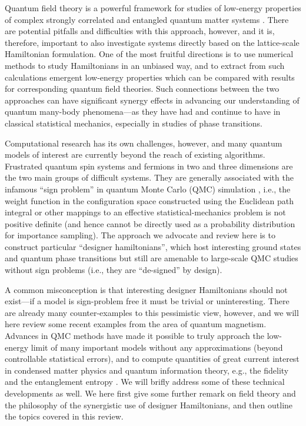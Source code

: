 \documentclass[range]{ar2e}
\begin{document}
Quantum field theory is a powerful framework for studies of low-energy properties of complex strongly 
correlated and entangled quantum matter systems \cite{Sachdev11}. There are potential pitfalls and difficulties 
with this approach, however, and it is, therefore, important to also investigate systems directly based on the 
lattice-scale Hamiltonian formulation. One of the most fruitful directions is to use numerical methods to study 
Hamiltonians in an unbiased way, and to extract from such calculations emergent low-energy properties which can be 
compared with results for corresponding quantum field theories. Such connections between the two approaches 
can have significant synergy effects in advancing our understanding of quantum many-body phenomena---as they
have had and continue to have in classical statistical mechanics, especially in studies of phase transitions. 

Computational research has its own challenges, however, and many quantum models of interest are currently beyond the reach 
of existing algorithms. Frustrated quantum spin systems and fermions in two and three dimensions are the two main groups 
of difficult systems. They are generally associated with the infamous ``sign problem'' in quantum Monte Carlo (QMC) simulation
\cite{Loh90,Henelius00,Nyfeler08}, i.e., the weight function in the configuration space constructed using the Euclidean path 
integral or other mappings to an effective statistical-mechanics problem is not positive definite (and hence cannot be directly 
used as a probability distribution for importance sampling). The approach we advocate and review here is to construct particular 
``designer hamiltonians'', which host interesting ground states and quantum phase transitions but still are amenable to 
large-scale QMC studies without sign problems (i.e., they are ``de-signed'' by design). 

A common misconception is that interesting designer Hamiltonians should not exist---if a model is sign-problem 
free it must be trivial or uninteresting. There are already many counter-examples to this pessimistic view, 
however, and we will here review some recent examples from the area of quantum magnetism. Advances in QMC 
methods \cite{Sandvik91,Evertz93,Beard96,WormA,Sandvik99,Sandvik10a} have made it possible to truly approach the 
low-energy limit of many important models without any approximations (beyond controllable statistical errors), and to compute 
quantities of great current interest in condensed matter physics and quantum information theory, e.g., the fidelity 
\cite{Schwandt09,Degrandi11} and the entanglement entropy \cite{Hastings10, Melko10}. We will brifly address some of these technical 
developments as well. We here first give some further remark on field theory and the philosophy of the synergistic use of 
designer Hamiltonians, and then outline the topics covered in this review.
\end{document}
